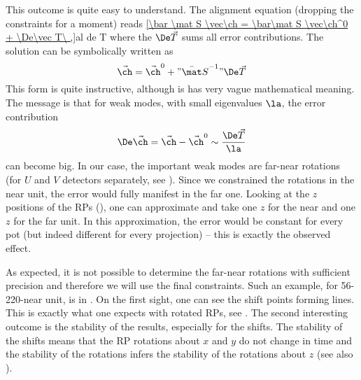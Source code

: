 This outcome is quite easy to understand. The alignment equation  (dropping the constraints for a moment) reads
\eqref{\bar \mat S \vec\ch = \bar\mat S \vec\ch^0 + \De\vec T\ ,}{al de T}
where the $\De\vec T$ sums all error contributions. The solution can be symbolically written as
$$\vec\ch = \vec\ch^0 + " {\bar\mat S}^{-1} " \De \vec T$$
This form is quite instructive, although is has very vague mathematical meaning. The message is that for weak modes, with small eigenvalues $\la$, the error contribution
$$\De\vec\ch = \vec\ch - \vec\ch^0 \sim {\De\vec T\over\la}$$
can become big. In our case, the important weak modes are far-near rotations (for $U$ and $V$ detectors separately, see ). Since we constrained the rotations in the near unit, the error would fully manifest in the far one. Looking at the $z$ positions of the RPs (), one can approximate and take one $z$ for the near and one $z$ for the far unit. In this approximation, the error would be constant for every pot (but indeed different for every projection) -- this is exactly the observed effect.


As expected, it is not possible to determine the far-near rotations with sufficient precision and therefore we will use the final constraints. Such an example, for 56-220-near unit, is in . On the first sight, one can see the shift points forming lines. This is exactly what one expects with rotated RPs, see . The second interesting outcome is the stability of the results, especially for the shifts. The stability of the shifts means that the RP rotations about $x$ and $y$ do not change in time and the stability of the rotations infers the stability of the rotations about $z$ (see also ). 



